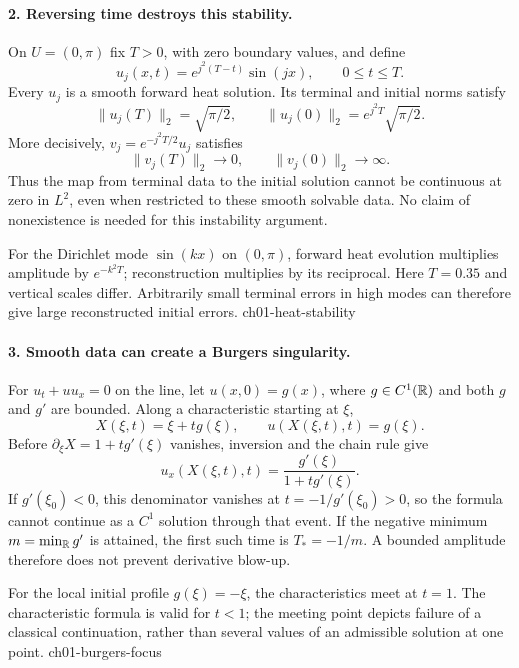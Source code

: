 \paragraph{2. Reversing time destroys this stability.}
On $U=(0,\pi)$ fix $T>0$, with zero boundary values, and define
\[
 u_j(x,t)=e^{j^2(T-t)}\sin(jx),\qquad 0\leq t\leq T.
\]
Every $u_j$ is a smooth forward heat solution. Its terminal and initial
norms satisfy
\[
 \|u_j(T)\|_2=\sqrt{\pi/2},\qquad
 \|u_j(0)\|_2=e^{j^2T}\sqrt{\pi/2}.
\]
More decisively, $v_j=e^{-j^2T/2}u_j$ satisfies
\[
 \|v_j(T)\|_2\longrightarrow0,
 \qquad \|v_j(0)\|_2\longrightarrow\infty.
\]
Thus the map from terminal data to the initial solution cannot be continuous
at zero in $L^2$, even when restricted to these smooth solvable data.
No claim of nonexistence is needed for this instability argument.


{For the Dirichlet mode $\sin(kx)$ on $(0,\pi)$, forward heat evolution multiplies amplitude by $e^{-k^2T}$; reconstruction multiplies by its reciprocal. Here $T=0.35$ and vertical scales differ. Arbitrarily small terminal errors in high modes can therefore give large reconstructed initial errors.}
{ch01-heat-stability}

\paragraph{3. Smooth data can create a Burgers singularity.}
For $u_t+uu_x=0$ on the line, let $u(x,0)=g(x)$, where $g\in C^1(\mathbb{R})$
and both $g$ and $g'$ are bounded. Along a characteristic starting at $\xi$,
\[
 X(\xi,t)=\xi+t g(\xi),\qquad u(X(\xi,t),t)=g(\xi).
\]
Before $\partial_\xi X=1+t g'(\xi)$ vanishes, inversion and the chain rule
give
\[
 u_x(X(\xi,t),t)=\frac{g'(\xi)}{1+t g'(\xi)}.
\]
If $g'(\xi_0)<0$, this denominator vanishes at
$t=-1/g'(\xi_0)>0$, so the formula cannot continue as a $C^1$ solution
through that event. If the negative minimum $m=\min_{\mathbb{R}}g'$ is attained,
the first such time is $T_*=-1/m$. A bounded amplitude therefore does not
prevent derivative blow-up.
\par\Needspace{65mm}


{For the local initial profile $g(\xi)=-\xi$, the characteristics meet at $t=1$. The characteristic formula is valid for $t<1$; the meeting point depicts failure of a classical continuation, rather than several values of an admissible solution at one point.}
{ch01-burgers-focus}

